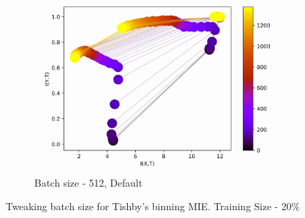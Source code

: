 \documentclass[dissertation.tex]{subfiles}
\begin{document}
\begin{figure}[ht]
\begin{subfigure}[t]{0.3332\textwidth}
    \centering
    \includegraphics[width=\textwidth]{figs/eval/batchSize/Binning512.jpg}
    \caption{
      Batch size - 512, Default
    }
    \label{figBatchSize512}
  \end{subfigure}
  \caption{
      Tweaking batch size for Tishby's binning MIE. Training Size - 20\%
    }
  \label{figBatchSize}
\end{figure}
\end{document}
